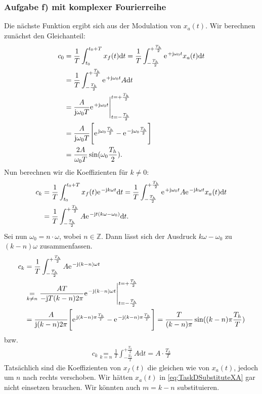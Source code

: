 \documentclass[11pt,a4paper,DIV=12]{scrartcl}
\newcommand{\diff}{\mathrm{d}}
\begin{document}
\subsubsection*{Aufgabe f) mit komplexer Fourierreihe}
\label{sec:TaskDComplex}
Die nächste Funktion ergibt sich aus der Modulation von $x_{a}(t)$. Wir berechnen zunächst den Gleichanteil:
\begin{align}
	c_0&=\frac{1}{T}\int_{t_0}^{t_0+T}x_{f}(t)\diff t=\frac{1}{T}\int_{-\frac{T_h}{2}}^{+\frac{T_h}{2}}\e^{+\im\omega_0 t}x_{a}(t)\diff t\nonumber \\
	&=\frac{1}{T}\int_{-\frac{T_h}{2}}^{+\frac{T_h}{2}}\e^{+\im\omega_0 t}A\diff t \nonumber \\
	&=\frac{A}{\im\omega_0 T}\e^{+\im \omega_0 t}\Bigg |_{t=-\frac{T_h}{2}}^{t=+\frac{T_h}{2}} \nonumber \\
	&=\frac{A}{\im\omega_0 T}\Bigg [\e^{\im\omega_0\frac{T_h}{2}}-\e^{-\im\omega_0\frac{T_h}{2}}\Bigg ]\nonumber \\
	&=\frac{2A}{\omega_0 T}\sin(\omega_0\frac{T_h}{2}).
\end{align}
Nun berechnen wir die Koeffizienten für $k\neq 0$:
\begin{align}
	\label{eq:TaskDSubstituteXA}
	c_k&=\frac{1}{T}\int_{t_0}^{t_0+T}x_{f}(t)\e^{-\im k \omega t}\diff t=\frac{1}{T}\int_{-\frac{T_h}{2}}^{+\frac{T_h}{2}}\e^{+\im\omega_0 t}A\e^{-\im k \omega t}x_a(t)\diff t \\
	&=\frac{1}{T}\int_{-\frac{T_h}{2}}^{+\frac{T_h}{2}}A\e^{-\im t(k\omega -\omega_0)}\diff t.
\end{align}
Sei nun $\omega_0=n\cdot\omega$, wobei $n\in\mathbb{Z}$. Dann lässt sich der Ausdruck $k\omega -\omega_0$ zu $(k-n)\omega$ zusammenfassen.
\begin{align}
	c_k&=\frac{1}{T}\int_{-\frac{T_h}{2}}^{+\frac{T_h}{2}}A\e^{-\im (k-n)\omega t} \nonumber \\
	&\underset{k\neq n}{=}\frac{AT}{-\im T(k-n) 2\pi}\e^{-\im (k-n)\omega t}\Bigg |_{t=-\frac{T_h}{2}}^{t=+\frac{T_h}{2}} \nonumber \\
	&=\frac{A}{\im (k-n)2 \pi}\Bigg [\e^{\im (k-n)\pi\frac{T_h}{T}}-\e^{-\im (k-n)\pi \frac{T_h}{T}}\Bigg ] = \frac{T}{(k-n)\pi}\sin((k-n)\pi\frac{T_h}{T})
\end{align}
bzw.
\begin{align}
	c_k\underset{k=n}{=}\frac{1}{T}\int_{-\frac{T_h}{2}}^{+\frac{T_h}{2}}A\diff t=A\cdot\frac{T_h}{T}
\end{align}
Tatsächlich sind die Koeffizienten von $x_{f}(t)$ die gleichen wie von $x_{a}(t)$, jedoch um $n$ nach rechts verschoben. Wir hätten $x_{a}(t)$ in \eqref{eq:TaskDSubstituteXA} gar nicht einsetzen brauchen. Wir könnten auch $m=k-n$ substituieren.
\end{document}

